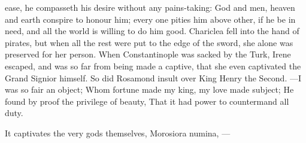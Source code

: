 {ease, he compasseth his desire without any pains-taking: God and men,
heaven and earth conspire to honour him; every one pities him above
other, if he be in need, and all the world is willing to do him
good. Chariclea fell into the hand of pirates, but when all the
rest were put to the edge of the sword, she alone was preserved for her
person. When Constantinople was sacked by the Turk, Irene
escaped, and was so far from being made a captive, that she even
captivated the Grand Signior himself. So did Rosamond insult over King
Henry the Second.
---I was so fair an object;
Whom fortune made my king, my love made subject;
He found by proof the privilege of beauty,
That it had power to countermand all duty.

It captivates the very gods themselves, Morosiora numina,
---

}
